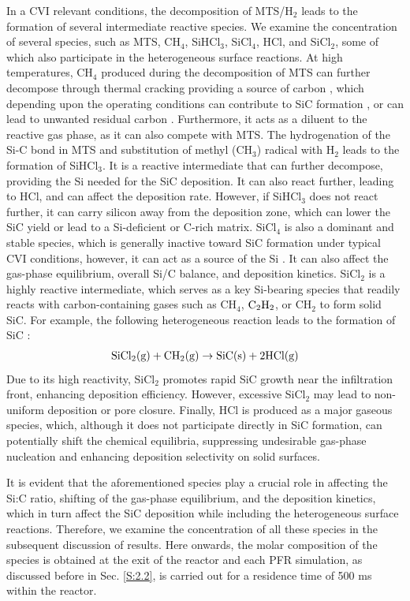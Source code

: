 \documentclass[final, letterpaper, square, comma, numbers, sort&compress]{elsarticle}
\begin{document}
In a CVI relevant conditions, the decomposition of MTS/H$_2$ leads to the formation of several intermediate reactive species. We examine the concentration of several species, such as MTS, CH$_4$, SiHCl$_3$, SiCl$_4$, HCl, and SiCl$_2$, some of which also participate in the heterogeneous surface reactions. At high temperatures, CH$_4$ produced during the decomposition of MTS can further decompose through thermal cracking providing a source of carbon \cite{Golecki2003}, which depending upon the operating conditions can contribute to SiC formation \cite{Aarnaes2020}, or can lead to unwanted residual carbon \cite{Ksiazek2014,Aarnaes2022}. Furthermore, it acts as a diluent to the reactive gas phase, as it can also compete with MTS. The hydrogenation of the Si-C bond in MTS and substitution of methyl (CH$_3$) radical with H$_2$ leads to the formation of SiHCl$_3$. It is a reactive intermediate that can further decompose, providing the Si needed for the SiC deposition. It can also react further, leading to HCl, and can affect the deposition rate. However, if SiHCl$_3$ does not react further, it can carry silicon away from the deposition zone, which can lower the SiC yield or lead to a Si-deficient or C-rich matrix. SiCl$_4$ is also a dominant and stable species, which is generally inactive toward SiC formation under typical CVI conditions, however, it can act as a source of the Si \cite{Dang2022,Hu2019}. It can also affect the gas-phase equilibrium, overall Si/C balance, and deposition kinetics. SiCl$_2$ is a highly reactive intermediate, which serves as a key Si-bearing species that readily reacts with carbon-containing gases such as CH$_4$, $\rm C_2H_2$, or CH$_2$ to form solid SiC. For example, the following heterogeneous reaction leads to the formation of SiC \cite{Papasouliotis1994}:
\begin{align*}
    \rm SiCl_2(g) + CH_2(g) \rightarrow SiC(s) + 2HCl(g)
\end{align*}
Due to its high reactivity, SiCl$_2$ promotes rapid SiC growth near the infiltration front, enhancing deposition efficiency. However, excessive SiCl$_2$ may lead to non-uniform deposition or pore closure. Finally, HCl is produced as a major gaseous species, which, although it does not participate directly in SiC formation, can potentially shift the chemical equilibria, suppressing undesirable gas-phase nucleation and enhancing deposition selectivity on solid surfaces.

It is evident that the aforementioned species play a crucial role in affecting the Si:C ratio, shifting of the gas-phase equilibrium, and the deposition kinetics, which in turn affect the SiC deposition while including the heterogeneous surface reactions. Therefore, we examine the concentration of all these species in the subsequent discussion of results. Here onwards, the molar composition of the species is obtained at the exit of the reactor and each PFR simulation, as discussed before in Sec. \ref{S:2.2}, is carried out for a residence time of 500 ms within the reactor.
\end{document}
